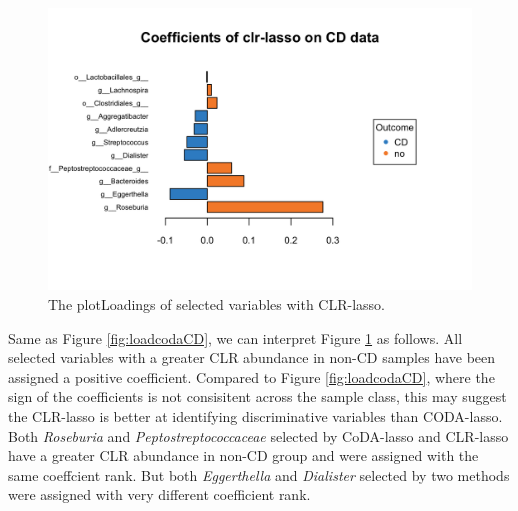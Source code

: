 \documentclass[openany]{book}
\newenvironment{Shaded}{\begin{snugshade}}{\end{snugshade}}
\newcommand{\KeywordTok}[1]{\textcolor[rgb]{0.13,0.29,0.53}{\textbf{#1}}}
\newcommand{\DataTypeTok}[1]{\textcolor[rgb]{0.13,0.29,0.53}{#1}}
\newcommand{\StringTok}[1]{\textcolor[rgb]{0.31,0.60,0.02}{#1}}
\newcommand{\CommentTok}[1]{\textcolor[rgb]{0.56,0.35,0.01}{\textit{#1}}}
\newcommand{\OperatorTok}[1]{\textcolor[rgb]{0.81,0.36,0.00}{\textbf{#1}}}
\newcommand{\NormalTok}[1]{#1}
\begin{document}
\begin{Shaded}
\end{Shaded}

\begin{figure}

{\centering \includegraphics[width=1\linewidth]{./Generated_plots/loadclrCD-1} 

}

\caption{The plotLoadings of selected variables with CLR-lasso.}\label{fig:loadclrCD}
\end{figure}

Same as Figure \ref{fig:loadcodaCD}, we can interpret Figure
\ref{fig:loadclrCD} as follows. All selected variables with a greater
CLR abundance in non-CD samples have been assigned a positive
coefficient. Compared to Figure \ref{fig:loadcodaCD}, where the sign of
the coefficients is not consisitent across the sample class, this may
suggest the CLR-lasso is better at identifying discriminative variables
than CODA-lasso. Both \emph{Roseburia} and \emph{Peptostreptococcaceae}
selected by CoDA-lasso and CLR-lasso have a greater CLR abundance in
non-CD group and were assigned with the same coeffcient rank. But both
\emph{Eggerthella} and \emph{Dialister} selected by two methods were
assigned with very different coefficient rank.
\end{document}
